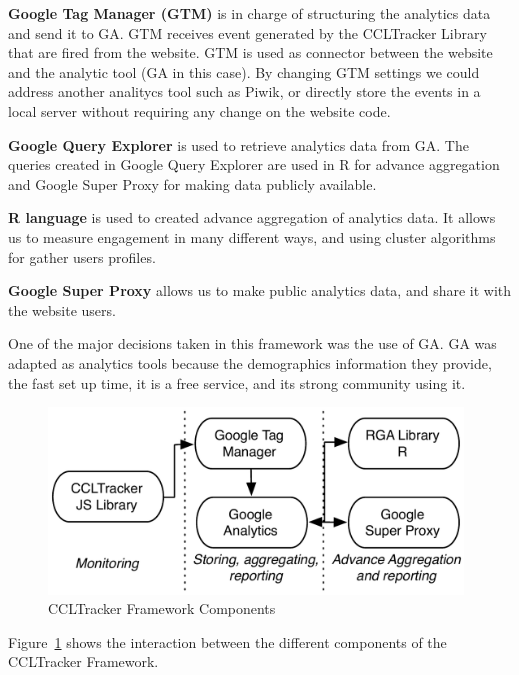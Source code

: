 \documentclass{article}
\begin{document}
\textbf{Google Tag Manager (GTM)} is in charge of structuring the analytics data and send it to GA. GTM receives event generated by the CCLTracker Library that are fired from the website. GTM is used as connector between the website and the analytic tool (GA in this case). By changing GTM settings we could address another analitycs tool such as Piwik, or directly store the events in a local server without requiring any change on the website code. 

\textbf{Google Query Explorer} is used to retrieve analytics data from GA. The queries created in Google Query Explorer are used in R for advance aggregation and Google Super Proxy for making data publicly available. 

\textbf{R language} is used to created advance aggregation of analytics data. It allows us to measure engagement in many different ways, and using cluster algorithms for gather users profiles. 

\textbf{Google Super Proxy} allows us to make public analytics data, and share it with the website users. 


One of the major decisions taken in this framework was the use of GA. GA was adapted as analytics tools because the demographics information they provide, the fast set up time, it is a free service, and its strong community using it. 



\begin{figure}[t]
  \begin{center}
		\includegraphics[width=11cm]{imgs/ccltrackerFramework.pdf}
  \end{center}
\caption{CCLTracker Framework Components}
\label{img:CCLTrackerFrameworkComponents}
\end{figure}

Figure~\ref{img:CCLTrackerFrameworkComponents} shows the interaction between the different components of the CCLTracker Framework. 


\end{document}

